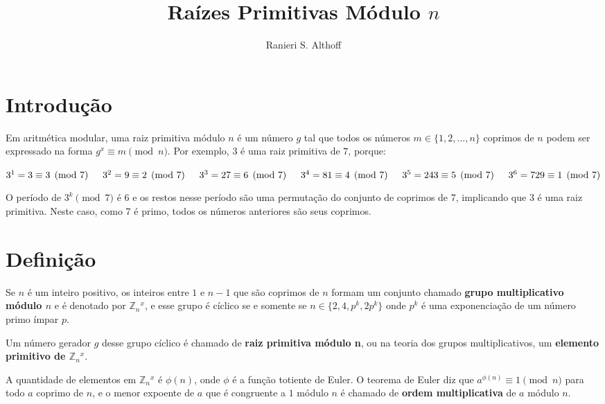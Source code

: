 \documentclass[12pt]{article}
\title{Raízes Primitivas Módulo $n$}
\author{Ranieri S. Althoff\inst{1}}
\begin{document}
\maketitle

\section{Introdução}\label{sec:firstpage}

Em aritmética modular, uma raiz primitiva módulo $n$ é um número $g$ tal que
todos os números $m \in \{1, 2, \ldots, n\}$ coprimos de $n$ podem ser
expressado na forma $g^{x} \equiv m \pmod{n}$. Por exemplo, $3$ é uma raiz
primitiva de $7$, porque:

\begin{math}
        3^{1} = 3 \equiv 3 \pmod{7} \\
\indent 3^{2} = 9 \equiv 2 \pmod{7} \\
\indent 3^{3} = 27 \equiv 6 \pmod{7} \\
\indent 3^{4} = 81 \equiv 4 \pmod{7} \\
\indent 3^{5} = 243 \equiv 5 \pmod{7} \\
\indent 3^{6} = 729 \equiv 1 \pmod{7}
\end{math}

O período de $3^{k} \pmod{7}$ é $6$ e os restos nesse período são uma
permutação do conjunto de coprimos de 7, implicando que 3 é uma raiz primitiva.
Neste caso, como 7 é primo, todos os números anteriores são seus coprimos.

\section{Definição}

Se $n$ é um inteiro positivo, os inteiros entre $1$ e $n - 1$ que são coprimos
de $n$ formam um conjunto chamado \textbf{grupo multiplicativo módulo $n$} e é
denotado por $\mathbb{Z}_{n}\phantom{}^{x}$, e esse grupo é cíclico se e
somente se $n \in \{2, 4, p^{k}, 2p^{k}\}$ onde $p^{k}$ é uma exponenciação de
um número primo ímpar $p$.

Um número gerador $g$ desse grupo cíclico é chamado de
\textbf{raiz primitiva módulo n}, ou na teoria dos grupos multiplicativos, um
\textbf{elemento primitivo de $\mathbb{Z}_{n}\phantom{}^{x}$}.

A quantidade de elementos em $\mathbb{Z}_{n}\phantom{}^{x}$ é $\phi(n)$, onde
$\phi$ é a função totiente de Euler. O teorema de Euler diz que
$a^{\phi(n)} \equiv 1 \pmod{n}$ para todo $a$ coprimo de $n$, e o menor
expoente de $a$ que é congruente a $1$ módulo $n$ é chamado de
\textbf{ordem multiplicativa} de $a$ módulo $n$.
\end{document}
